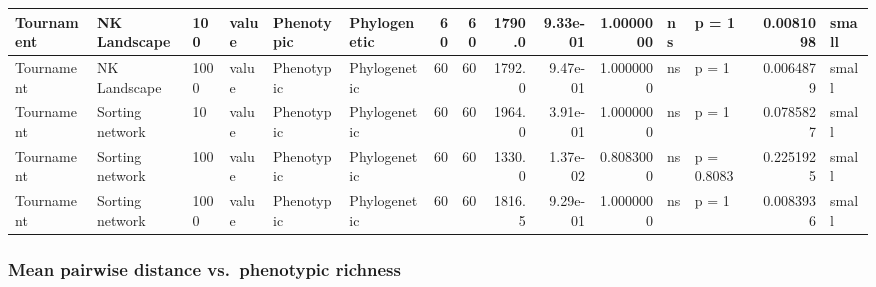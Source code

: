 \documentclass[]{book}
\begin{document}
\begin{table}
\begin{tabular}[t]{l|l|l|l|l|l|r|r|r|r|r|l|l|r|l}
\hline
Tournament & NK Landscape & 100 & value & Phenotypic & Phylogenetic & 60 & 60 & 1790.0 & 9.33e-01 & 1.0000000 & ns & p = 1 & 0.0081098 & small\\
\hline
Tournament & NK Landscape & 1000 & value & Phenotypic & Phylogenetic & 60 & 60 & 1792.0 & 9.47e-01 & 1.0000000 & ns & p = 1 & 0.0064879 & small\\
\hline
Tournament & Sorting network & 10 & value & Phenotypic & Phylogenetic & 60 & 60 & 1964.0 & 3.91e-01 & 1.0000000 & ns & p = 1 & 0.0785827 & small\\
\hline
Tournament & Sorting network & 100 & value & Phenotypic & Phylogenetic & 60 & 60 & 1330.0 & 1.37e-02 & 0.8083000 & ns & p = 0.8083 & 0.2251925 & small\\
\hline
Tournament & Sorting network & 1000 & value & Phenotypic & Phylogenetic & 60 & 60 & 1816.5 & 9.29e-01 & 1.0000000 & ns & p = 1 & 0.0083936 & small\\
\hline
\end{tabular}
\end{table}

\hypertarget{mean-pairwise-distance-vs.phenotypic-richness-1}{%
\subsubsection{Mean pairwise distance vs.~phenotypic richness}\label{mean-pairwise-distance-vs.phenotypic-richness-1}}
\end{document}

